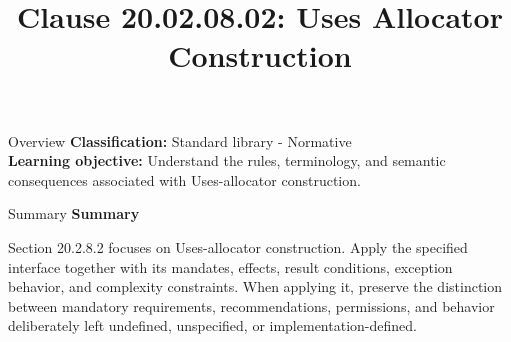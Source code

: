 \documentclass[10pt,letterpaper]{article}
\title{Clause 20.02.08.02: Uses Allocator Construction}
\author{}
\date{}
\begin{document}
\maketitle
\begin{CornellOverviewBox}{Overview}
\textbf{Classification:} Standard library - Normative\\[2pt]
\textbf{Learning objective:} Understand the rules, terminology, and semantic consequences associated with Uses-allocator construction.
\end{CornellOverviewBox}\begin{CornellSummaryBox}{Summary}
{\sffamily\bfseries\color{Accent} Summary}\par\vspace{3pt}Section 20.2.8.2 focuses on Uses-allocator construction. Apply the specified interface together with its mandates, effects, result conditions, exception behavior, and complexity constraints. When applying it, preserve the distinction between mandatory requirements, recommendations, permissions, and behavior deliberately left undefined, unspecified, or implementation-defined.
\end{CornellSummaryBox}
\end{document}
